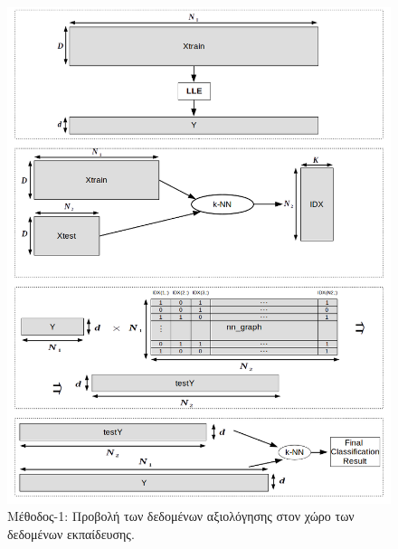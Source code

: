 \begin{figure}[H]
\centering
\includegraphics[scale=0.8]{figs/5.png}
\newline
\caption{ Μέθοδος-1: Προβολή των δεδομένων αξιολόγησης στον χώρο των δεδομένων εκπαίδευσης. } 
\end{figure}
\newpage

